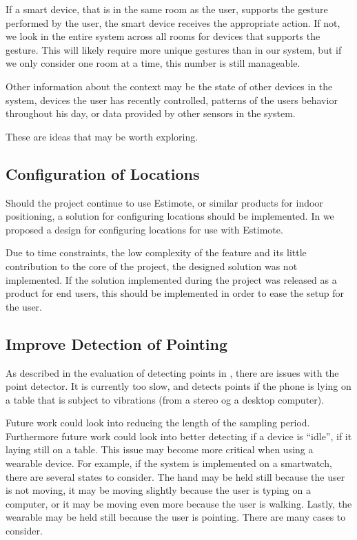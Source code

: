 If a smart device, that is in the same room as the user, 
supports the gesture performed by the user, 
the smart device receives the appropriate action. 
If not, we look in the entire system across all rooms for devices that supports the gesture.
This will likely require more unique gestures than in our system,
but if we only consider one room at a time, 
this number is still manageable.

Other information about the context may be the state of other devices in the system, 
devices the user has recently controlled, 
patterns of the users behavior throughout his day, 
or data provided by other sensors in the system.

These are ideas that may be worth exploring. 

\subsection{Configuration of Locations}

Should the project continue to use Estimote, 
or similar products for indoor positioning, 
a solution for configuring locations should be implemented. 
In  we proposed a design for configuring locations for use with Estimote. 

Due to time constraints, 
the low complexity of the feature and its little contribution to the core of the project, 
the designed solution was not implemented. 
If the solution implemented during the project was released as a product for end users, 
this should be implemented in order to ease the setup for the user.

\subsection{Improve Detection of Pointing}

As described in the evaluation of detecting points in , 
there are issues with the point detector. 
It is currently too slow, 
and detects points if the phone is lying on a table that is subject to vibrations (from \eg a stereo og a desktop computer).

Future work could look into reducing the length of the sampling period. 
Furthermore future work could look into better detecting if a device is ``idle'', 
\ie if it laying still on \eg a table. 
This issue may become more critical when using a wearable device. 
For example, if the system is implemented on a smartwatch, 
there are several states to consider. 
The hand may be held still because the user is not moving, 
it may be moving slightly because the user is typing on a computer, 
or it may be moving even more because the user is walking. 
Lastly, the wearable may be held still because the user is pointing. 
There are many cases to consider.

